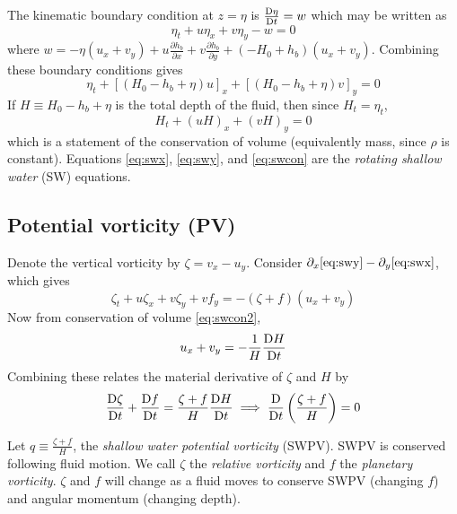 \documentclass{jknotes}
\begin{document}
The kinematic boundary condition at $z = \eta$ is $\frac{\mathrm{D} \eta}{\mathrm{D}
t} = w$ which may be written as
\begin{equation}
	\eta_t + u \eta_x + v \eta_y - w = 0
\end{equation}
where $w = -\eta(u_x+v_y) + u \frac{\partial h_b}{\partial x} + v
\frac{\partial h_b}{\partial y} + (-H_0 + h_b)(u_x+v_y)$. Combining these
boundary conditions gives
\begin{equation}
	\eta_t + \left[ (H_0-h_b+\eta)u\right]_x + \left[ (H_0-h_b+\eta)v\right]_y
	= 0 \label{eq:swcon}
\end{equation}
If $H \equiv H_0 - h_b + \eta$ is the total depth of the fluid, then since
$H_t = \eta_t$,
\begin{equation}
	H_t + (uH)_x + (vH)_y = 0 \label{eq:swcon2}
\end{equation}
which is a statement of the conservation of volume (equivalently mass, since
$\rho$ is constant). Equations \eqref{eq:swx}, \eqref{eq:swy}, and
\eqref{eq:swcon} are the \emph{rotating shallow water} (SW) equations.

\subsection{Potential vorticity (PV)}
Denote the vertical vorticity by $\zeta = v_x - u_y$. Consider $\partial_x
\eqref{eq:swy} - \partial_y \eqref{eq:swx}$, which gives
\begin{equation}
	\zeta_t +u\zeta_x + v\zeta_y + v f_y = -(\zeta + f)(u_x+v_y)
\end{equation}
Now from conservation of volume \eqref{eq:swcon2},
\begin{equation} 
	u_x + v_y = -\frac{1}{H} \frac{\mathrm{D} H}{\mathrm{D} t}
\end{equation}
Combining these relates the material derivative of $\zeta$ and $H$ by
\begin{equation}
	\frac{\mathrm{D} \zeta}{\mathrm{D} t} + \frac{\mathrm{D} f}{\mathrm{D} t}= \frac{\zeta + f}{H} \frac{\mathrm{D} H}{\mathrm{D}
	t} \implies \frac{\mathrm{D}}{\mathrm{D} t}\left(\frac{\zeta + f}{H}\right) = 0
	\label{eq:PV}
\end{equation}

Let $q \equiv \frac{\zeta + f}{H}$, the \emph{shallow water potential
vorticity} (SWPV). SWPV is conserved following fluid motion. We call $\zeta$
the \emph{relative vorticity} and $f$ the \emph{planetary vorticity}. $\zeta$
and $f$ will change as a fluid moves to conserve SWPV (changing $f$) and
angular momentum (changing depth).
\end{document}
